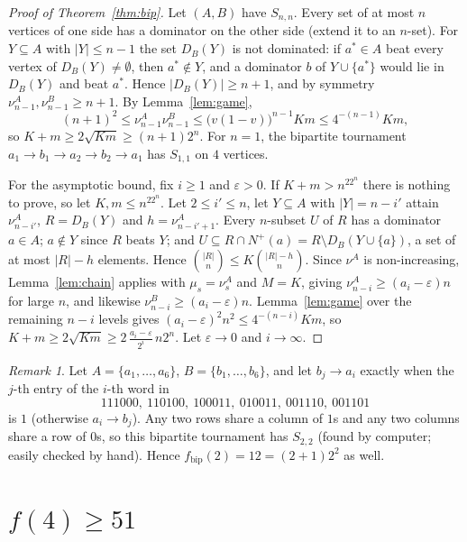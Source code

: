\documentclass[11pt]{amsart}
\theoremstyle{definition}
\theoremstyle{remark}
\newtheorem{remark}[theorem]{Remark}
\newcommand{\D}{D}
\newcommand{\Nout}{N^{+}}
\newcommand{\fb}{f_{\mathrm{bip}}}
\newcommand{\abs}[1]{\lvert #1\rvert}
\begin{document}
\begin{proof}[Proof of Theorem~\ref{thm:bip}]
Let $(A,B)$ have $S_{n,n}$. Every set of at most $n$ vertices of one side has a dominator on the other side (extend it to an
$n$-set). For $Y\subseteq A$ with $\abs Y\le n-1$ the set $\D_B(Y)$ is not dominated: if $a^*\in A$ beat every vertex of
$\D_B(Y)\neq\emptyset$, then $a^*\notin Y$, and a dominator $b$ of $Y\cup\{a^*\}$ would lie in $\D_B(Y)$ and beat $a^*$.
Hence $\abs{\D_B(Y)}\ge n+1$, and by symmetry $\nu^A_{n-1},\nu^B_{n-1}\ge n+1$. By Lemma~\ref{lem:game},
\[
  (n+1)^2\le\nu^A_{n-1}\nu^B_{n-1}\le\bigl(v(1-v)\bigr)^{n-1}Km\le4^{-(n-1)}Km,
\]
so $K+m\ge2\sqrt{Km}\ge(n+1)2^n$. For $n=1$, the bipartite tournament $a_1\to b_1\to a_2\to b_2\to a_1$ has $S_{1,1}$ on $4$
vertices.

For the asymptotic bound, fix $i\ge1$ and $\varepsilon>0$. If $K+m>n^22^n$ there is nothing to prove, so let $K,m\le n^22^n$. Let
$2\le i'\le n$, let $Y\subseteq A$ with $\abs Y=n-i'$ attain $\nu^A_{n-i'}$, $R=\D_B(Y)$ and $h=\nu^A_{n-i'+1}$. Every $n$-subset $U$
of $R$ has a dominator $a\in A$; $a\notin Y$ since $R$ beats $Y$; and $U\subseteq R\cap\Nout(a)=R\setminus\D_B(Y\cup\{a\})$, a set of
at most $\abs R-h$ elements. Hence $\binom{\abs R}{n}\le K\binom{\abs R-h}{n}$. Since $\nu^A$ is non-increasing, Lemma~\ref{lem:chain}
applies with $\mu_s=\nu^A_s$ and $M=K$, giving $\nu^A_{n-i}\ge(a_i-\varepsilon)n$ for large $n$, and likewise
$\nu^B_{n-i}\ge(a_i-\varepsilon)n$. Lemma~\ref{lem:game} over the remaining $n-i$ levels gives
$(a_i-\varepsilon)^2n^2\le4^{-(n-i)}Km$, so $K+m\ge2\sqrt{Km}\ge2\,\frac{a_i-\varepsilon}{2^i}\,n2^n$. Let $\varepsilon\to0$ and
$i\to\infty$.
\end{proof}

\begin{remark}\label{rem:fb2}
Let $A=\{a_1,\dots,a_6\}$, $B=\{b_1,\dots,b_6\}$, and let $b_j\to a_i$ exactly when the $j$-th entry of the $i$-th word in
\[
  111000,\ 110100,\ 100011,\ 010011,\ 001110,\ 001101
\]
is $1$ (otherwise $a_i\to b_j$). Any two rows share a column of $1$s and any two columns share a row of $0$s, so this bipartite
tournament has $S_{2,2}$ (found by computer; easily checked by hand). Hence $\fb(2)=12=(2+1)2^2$ as well.
\end{remark}

\section{\texorpdfstring{$f(4)\ge 51$}{f(4) >= 51}}\label{sec:51}
\end{document}
